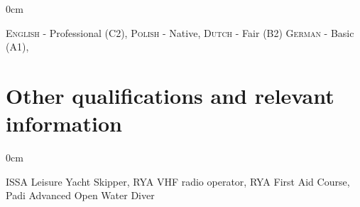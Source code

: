 \documentclass[a4paper,10pt]{article}
\begin{document}
\begin{minipage}{\textwidth}
\begin{adjustwidth}{}{0cm}

\textsc{English} - Professional (C2), %
\textsc{Polish} - Native, %
\textsc{Dutch} - Fair (B2)  %
\textsc{German} - Basic (A1),

\end{adjustwidth}
\end{minipage}


\section{Other qualifications and relevant information}

\begin{minipage}{\textwidth}
\begin{adjustwidth}{}{0cm}

ISSA Leisure Yacht Skipper,
RYA VHF radio operator,
RYA First Aid Course,
Padi Advanced Open Water Diver

\end{adjustwidth}
\end{minipage}

\newpage

\end{document}
